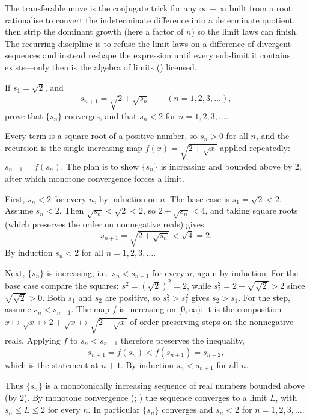 \documentclass[main.tex]{subfiles}
\begin{document}
\begin{Reflection}
The transferable move is the conjugate trick for any $\infty-\infty$ built from a root: rationalise to
convert the indeterminate difference into a determinate quotient, then strip the dominant growth (here a
factor of $n$) so the limit laws can finish. The recurring discipline is to refuse the limit laws on a
difference of divergent sequences and instead reshape the expression until every sub-limit it contains
exists---only then is the algebra of limits () licensed.
\end{Reflection}

If $s_{1} = \sqrt{2}$, and
\[
s_{n+1} = \sqrt{2 + \sqrt{s_{n}}} \qquad (n = 1, 2, 3, \ldots),
\]
prove that $\{s_{n}\}$ converges, and that $s_{n} < 2$ for $n = 1, 2, 3, \ldots$.

\begin{SolutionBlue}
Every term is a square root of a positive number, so $s_{n}>0$ for all $n$, and the recursion is the
single increasing map $f(x)=\sqrt{2+\sqrt{x}}$ applied repeatedly: $s_{n+1}=f(s_{n})$. The plan is to
show $\{s_{n}\}$ is increasing and bounded above by $2$, after which monotone convergence forces a
limit.

First, $s_{n}<2$ for every $n$, by induction on $n$. The base case is $s_{1}=\sqrt 2<2$. Assume
$s_{n}<2$. Then $\sqrt{s_{n}}<\sqrt 2<2$, so $2+\sqrt{s_{n}}<4$, and taking square roots (which
preserves the order on nonnegative reals) gives
\[
s_{n+1}=\sqrt{2+\sqrt{s_{n}}}<\sqrt 4=2 .
\]
By induction $s_{n}<2$ for all $n=1,2,3,\dots$.

Next, $\{s_{n}\}$ is increasing, i.e.\ $s_{n}<s_{n+1}$ for every $n$, again by induction. For the base
case compare the squares: $s_{1}^{2}=(\sqrt 2)^{2}=2$, while
$s_{2}^{2}=2+\sqrt{\sqrt 2}>2$ since $\sqrt{\sqrt 2}>0$. Both $s_{1}$ and $s_{2}$ are positive, so
$s_{2}^{2}>s_{1}^{2}$ gives $s_{2}>s_{1}$. For the step, assume $s_{n}<s_{n+1}$. The map $f$ is
increasing on $[0,\infty)$: it is the composition $x\mapsto\sqrt x\mapsto 2+\sqrt x\mapsto
\sqrt{2+\sqrt x}$ of order-preserving steps on the nonnegative reals. Applying $f$ to
$s_{n}<s_{n+1}$ therefore preserves the inequality,
\[
s_{n+1}=f(s_{n})<f(s_{n+1})=s_{n+2},
\]
which is the statement at $n+1$. By induction $s_{n}<s_{n+1}$ for all $n$.

Thus $\{s_{n}\}$ is a monotonically increasing sequence of real numbers bounded above (by $2$). By
monotone convergence (;
) the sequence converges to a limit $L$, with $s_{n}\le L\le 2$ for every $n$. In
particular $\{s_{n}\}$ converges and $s_{n}<2$ for $n=1,2,3,\dots$.
\end{SolutionBlue}
\end{document}
